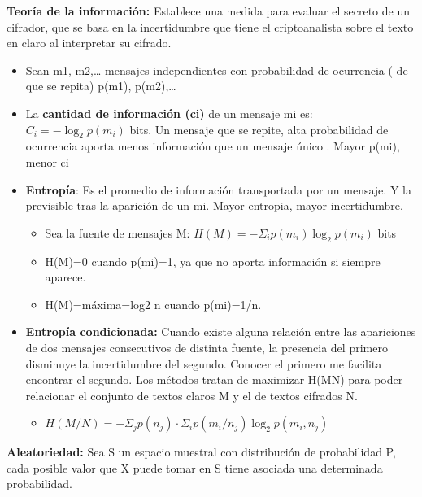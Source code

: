 \documentclass[12pt, twoside, openright]{report} %
\begin{document}
  
  \textbf{Teoría de la información:} Establece una medida para evaluar
  el secreto de un cifrador, que se basa en la incertidumbre que tiene
  el criptoanalista sobre el texto en claro al interpretar su cifrado.
  

  \begin{itemize}
  \item Sean m1, m2,\ldots{} mensajes independientes con probabilidad de
    ocurrencia ( de que se repita) p(m1), p(m2),\ldots{}
    
  \item La \textbf{cantidad de información (ci)} de un mensaje mi es: $C_i=-\log_2 p(m_i)$ bits. Un
    mensaje que se repite, alta probabilidad de ocurrencia aporta menos
    información que un mensaje único . Mayor p(mi), menor ci
    
  \item \textbf{Entropía}: Es el promedio de información transportada por un
    mensaje. Y la previsible tras la aparición de un mi. Mayor entropia,
    mayor incertidumbre.
    
    \begin{itemize}
    \item Sea la fuente de mensajes M: $H(M)=-\Sigma_i p(m_i) \log_2 p(m_i)$ bits
      
    \item H(M)=0 cuando p(mi)=1, ya que no aporta información si siempre
      aparece.
      
    \item H(M)=máxima=log2 n cuando p(mi)=1/n.
      
    \end{itemize}
  \item \textbf{Entropía condicionada:} Cuando existe alguna relación entre
    las apariciones de dos mensajes consecutivos de distinta fuente, la
    presencia del primero disminuye la incertidumbre del segundo.
    Conocer el primero me facilita encontrar el segundo. Los métodos
    tratan de maximizar H(M\textbar N) para poder relacionar el conjunto
    de textos claros M y el de textos cifrados N.
 
    \begin{itemize}
    \item $H(M/N) =-\Sigma_j p(n_j)\cdot \Sigma_i p(m_i/n_j) \log_2 p(m_i, n_j)$
      
    \end{itemize}
  \end{itemize}

  
  \textbf{Aleatoriedad:} Sea S un espacio muestral con distribución de
  probabilidad P, cada posible valor que X puede tomar en S tiene
  asociada una determinada probabilidad.
  
\end{document}
